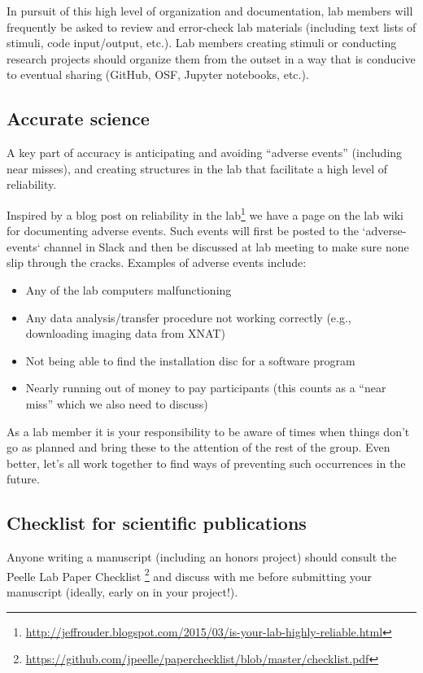 \documentclass[letterpaper,12pt,oneside]{memoir}
\begin{document}
In pursuit of this high level of organization and documentation, lab members will frequently be asked to review and error-check lab materials (including text lists of stimuli, code input/output, etc.). Lab members creating stimuli or conducting research projects should organize them from the outset in a way that is conducive to eventual sharing (GitHub, OSF, Jupyter notebooks, etc.).


\subsection{Accurate science}

A key part of accuracy is anticipating and avoiding ``adverse events'' (including near misses), and creating structures in the lab that facilitate a high level of reliability.

Inspired by a blog post on reliability in the lab\footnote{\url{http://jeffrouder.blogspot.com/2015/03/is-your-lab-highly-reliable.html}} we have a page on the lab wiki for documenting adverse events. Such events will first be posted to the `adverse-events` channel in Slack and then be discussed at lab meeting to make sure none slip through the cracks. Examples of adverse events include:

\begin{itemize}
\item Any of the lab computers malfunctioning
\item Any data analysis/transfer procedure not working correctly (e.g., downloading imaging data from XNAT)
\item Not being able to find the installation disc for a software program
\item Nearly running out of money to pay participants (this counts as a ``near miss'' which we also need to discuss)
\end{itemize}

As a lab member it is your responsibility to be aware of times when things don't go as planned and bring these to the attention of the rest of the group. Even better, let's all work together to find ways of preventing such occurrences in the future.


\subsection{Checklist for scientific publications}

Anyone writing a manuscript (including an honors project) should consult the Peelle Lab Paper Checklist \footnote{\url{https://github.com/jpeelle/paperchecklist/blob/master/checklist.pdf}} and discuss with me before submitting your manuscript (ideally, early on in your project!).
\end{document}
